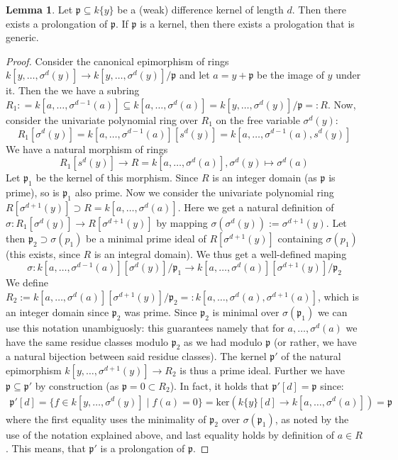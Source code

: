 \documentclass{article}
\def\p{\mathfrak{p}}
\def\s{\sigma}
\def\ker{\text{ker}}
\newenvironment{bew}{\begin{proof}[Proof]}{\end{proof}}
\theoremstyle{definition}
\newtheorem{lem}[Satz]{Lemma}
\begin{document}
\begin{lem}\label{genericprol}
Let $\p \subseteq k\{y\}$ be a (weak) difference kernel of length $d$. Then there exists a prolongation of $\p$. If $\p$ is a kernel, then there exists a prologation that is generic. 
\begin{bew}
Consider the canonical epimorphism of rings $k[y,\ldots,\s^{d}(y)] \rightarrow k[y,\ldots,\s^{d}(y)]/\p$ and let $a = y + \p$ be the image of $y$ under it. 
Then the we have a subring $R_1: = k[a,\ldots,\s^{d-1}(a)] \subseteq k[a,\ldots,\s^{d}(a)] = k[y,\ldots,\s^{d}(y)]/\p =: R$. Now, consider the univariate polynomial ring over $R_1$ on the free variable $\s^d(y)$:
\[ R_1[\s^d(y)] = k[a,\ldots,\s^{d-1}(a)][s^d(y)] = k[a,\ldots,\s^{d-1}(a),s^d(y)] \]
We have a natural morphism of rings \[ R_1[s^d(y)] \rightarrow R = k[a,\ldots,\s^{d}(a)], \s^d(y) \mapsto \s^d(a) \]
Let $\p_1$ be the kernel of this morphism. Since $R$ is an integer domain (as $\p$ is prime), so is $\p_1$ also prime. 
Now we consider the univariate polynomial ring $R[\s^{d+1}(y)] \supset R = k[a,\ldots, \s^d(a)]$. Here we get a natural definition of $\s: R_1[\s^d(y)] \rightarrow R[\s^{d+1}(y)]$ by mapping $\s( \s^d(y))  := \s^{d+1}(y)$.
Let then $\p_2 \supset \s(p_1)$ be a minimal prime ideal of $R[\s^{d+1}(y)]$ containing $\s(p_1)$ (this exists, since $R$ is an integral domain). 
We thus get a well-defined maping
\[ \s: k[a,\ldots,\s^{d-1}(a)][\s^d(y)]/\p_1 \rightarrow k[a,\ldots, \s^d(a)][\s^{d+1}(y)]/\p_2 \]
We define $R_2:= k[a,\ldots,\s^d(a)][\s^{d+1}(y)]/\p_2 =: k[a,\ldots,\s^d(a),\s^{d+1}(a)]$, which is an integer domain since $\p_2$ was prime. Since $\p_2$ is minimal over $\s(\p_1)$ we can use this notation unambiguosly:
this guarantees namely that for $a, \ldots, \s^d(a)$ we have the same residue classes modulo $\p_2$ as we had modulo $\p$ (or rather, we have a natural bijection between said residue classes).
The kernel $\p'$ of the natural epimorphism $k[y,\ldots,\s^{d+1}(y)] \rightarrow R_2$ is thus a prime ideal.
Further we have $\p \subseteq \p'$ by construction (as $\p = 0 \subset R_2$). In fact, it holds that $\p'[d] = \p$ since: 
\begin{align*}
\p'[d] = \{ f \in k[y,\ldots,\s^d(y)] \mid f(a) = 0 \} = \ker( k\{y\}[d] \rightarrow k[a,\ldots,\s^{d}(a)]) = \p
\end{align*}
where the first equality uses the minimality of $\p_2$ over $\s(\p_1)$, as noted by the use of the notation explained above, and last equality holds by definition of $a \in R$. This means, that $\p'$ is a prolongation of $\p$. 


\end{bew}
\end{lem}
\end{document}
